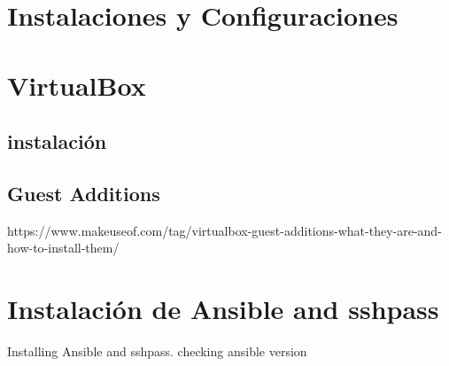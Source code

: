 \documentclass[../main.tex]{subfiles}
\begin{document}
\section*{Instalaciones y Configuraciones}
\section{VirtualBox}
\subsection{instalación}
\subsection{Guest Additions}
https://www.makeuseof.com/tag/virtualbox-guest-additions-what-they-are-and-how-to-install-them/
\section{Instalación de Ansible and sshpass}
Installing Ansible and sshpass. checking ansible version
\lstconsolestyle
\end{document}
